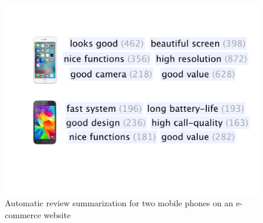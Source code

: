 \begin{figure}[th]
\centering
\includegraphics[width=0.6\columnwidth]{figures/phrases}
\caption{Automatic review summarization for two mobile phones 
	on an e-commerce website}
\label{fig:phrases}
\end{figure}


%

